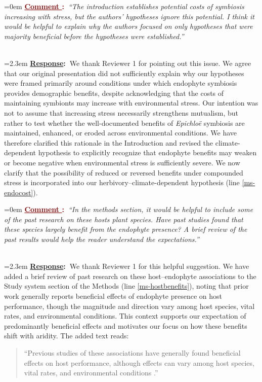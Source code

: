 \documentclass[12pt]{article}
\newcounter{cN}
\newcommand{\comment}[1]{
	\vspace{2em}
	\refstepcounter{cN} %
	\noindent \hangindent=0em \textbf{\textcolor{Maroon}{\uline{Comment \thecN}:~}}\emph{``#1''}
	}
\newcommand{\response}[1]{
	\\[0.25em]
	\hangindent=2.3em \textbf{\textcolor{NavyBlue}{\uline{Response}:~}}#1
	}
\providecommand{\uline}[1]{\underline{#1}}
\begin{document}
\comment{The introduction establishes potential costs of symbiosis increasing with stress, but the authors' hypotheses ignore this potential. I think it would be helpful to explain why the authors focused on only hypotheses that were majority beneficial before the hypotheses were established.}
\response{We thank Reviewer 1 for pointing out this issue. We agree that our original presentation did not sufficiently explain why our hypotheses were framed primarily around conditions under which endophyte symbiosis provides demographic benefits, despite acknowledging that the costs of maintaining symbionts may increase with environmental stress. Our intention was not to assume that increasing stress necessarily strengthens mutualism, but rather to test whether the well-documented benefits of \emph{Epichloë} symbiosis are maintained, enhanced, or eroded across environmental conditions. We have therefore clarified this rationale in the Introduction and revised the climate-dependent hypothesis to explicitly recognize that endophyte benefits may weaken or become negative when environmental stress is sufficiently severe. We now clarify that the possibility of reduced or reversed benefits under compounded stress is incorporated into our herbivory--climate-dependent hypothesis (line \ref{ms-endocost}).}

\comment{In the methods section, it would be helpful to include some of the past research on these hosts plant species. Have past studies found that these species largely benefit from the endophyte presence? A brief review of the past results would help the reader understand the expectations.}
\response{We thank Reviewer 1 for this helpful suggestion. We have added a brief review of past research on these host--endophyte associations to the Study system section of the Methods (line \ref{ms-hostbenefits}), noting that prior work generally reports beneficial effects of endophyte presence on host performance, though the magnitude and direction vary among host species, vital rates, and environmental conditions. This context supports our expectation of predominantly beneficial effects and motivates our focus on how these benefits shift with aridity. The added text reads:

	\begin{quote}
``Previous studies of these associations have generally found beneficial effects on host performance, although effects can vary among host species, vital rates, and environmental conditions \citep{yule2013costs,davitt2011understanding,gundel2020simulated,rudgers2009benefits}.''
\end{quote}
}
\end{document}
